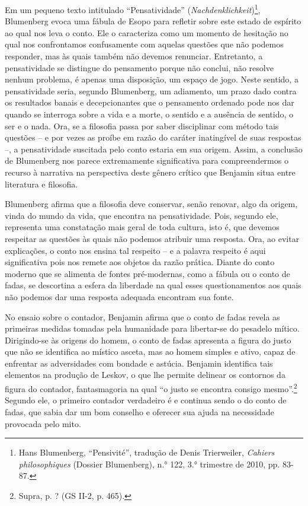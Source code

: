 Em um pequeno texto intitulado ``Pensatividade''
(\emph{Nachdenklichkeit})\footnote{Hans Blumenberg, ``Pensivité'',
  tradução de Denis Trierweiler, \emph{Cahiers philosophiques} (Dossier
  Blumenberg), n.° 122, 3.° trimestre de 2010, pp. 83-87.}, Blumenberg
evoca uma fábula de Esopo para refletir sobre este estado de espírito ao
qual nos leva o conto. Ele o caracteriza como um momento de hesitação no
qual nos confrontamos confusamente com aquelas questões que não podemos
responder, mas às quais também não devemos renunciar. Entretanto, a
pensatividade se distingue do pensamento porque não conclui, não resolve
nenhum problema, é apenas uma disposição, um espaço de jogo. Neste
sentido, a pensatividade seria, segundo Blumenberg, um adiamento, um
prazo dado contra os resultados banais e decepcionantes que o pensamento
ordenado pode nos dar quando se interroga sobre a vida e a morte, o
sentido e a ausência de sentido, o ser e o nada. Ora, se a filosofia
passa por saber disciplinar com método tais questões -- e por vezes as
proíbe em razão do caráter inatingível de suas respostas --, a
pensatividade suscitada pelo conto estaria em sua origem. Assim, a
conclusão de Blumenberg nos parece extremamente significativa para
compreendermos o recurso à narrativa na perspectiva deste gênero crítico
que Benjamin situa entre literatura e filosofia.

Blumenberg afirma que a filosofia deve conservar, senão renovar, algo da
origem, vinda do mundo da vida, que encontra na pensatividade. Pois,
segundo ele, representa uma constatação mais geral de toda cultura, isto
é, que devemos respeitar as questões às quais não podemos atribuir uma
resposta. Ora, ao evitar explicações, o conto nos ensina tal respeito --
e a palavra respeito é aqui significativa pois nos remete aos objetos da
razão prática. Diante do conto moderno que se alimenta de fontes
pré-modernas, como a fábula ou o conto de fadas, se descortina a esfera
da liberdade na qual esses questionamentos aos quais não podemos dar uma
resposta adequada encontram sua fonte.

No ensaio sobre o contador, Benjamin afirma que o conto de fadas revela
as primeiras medidas tomadas pela humanidade para libertar-se do
pesadelo mítico. Dirigindo-se às origens do homem, o conto de fadas
apresenta a figura do justo que não se identifica ao místico asceta, mas
ao homem simples e ativo, capaz de enfrentar as adversidades com bondade
e astúcia. Benjamin identifica tais elementos na produção de Leskov, o
que lhe permite delinear os contornos da figura do contador,
fantasmagoria na qual ``o justo se encontra consigo mesmo''.\footnote{Supra,
  p. ? (GS II-2, p. 465).} Segundo ele, o primeiro contador verdadeiro é
e continua sendo o do conto de fadas, que sabia dar um bom conselho e
oferecer sua ajuda na necessidade provocada pelo mito.

